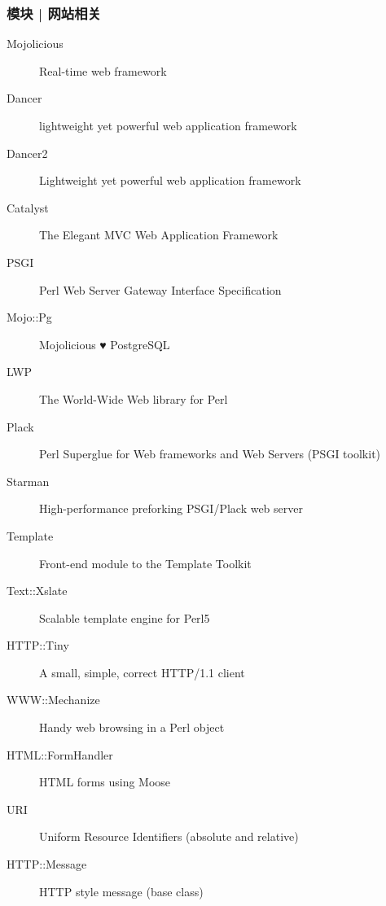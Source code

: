 \begin{frame}
  \frametitle{模块 | 网站相关}
  {\footnotesize
    \begin{description}
      \item[Mojolicious] Real-time web framework 
      \item[Dancer] lightweight yet powerful web application framework 
      \item[Dancer2] Lightweight yet powerful web application framework 
      \item[Catalyst] The Elegant MVC Web Application Framework 
      \item[PSGI] Perl Web Server Gateway Interface Specification
      \item[Mojo::Pg] Mojolicious ♥ PostgreSQL
      \item[LWP] The World-Wide Web library for Perl 
      \item[Plack] Perl Superglue for Web frameworks and Web Servers (PSGI toolkit) 
      \item[Starman] High-performance preforking PSGI/Plack web server
      \item[Template] Front-end module to the Template Toolkit
      \item[Text::Xslate] Scalable template engine for Perl5
      \item[HTTP::Tiny] A small, simple, correct HTTP/1.1 client
      \item[WWW::Mechanize] Handy web browsing in a Perl object
      \item[HTML::FormHandler] HTML forms using Moose
      \item[URI] Uniform Resource Identifiers (absolute and relative)
      \item[HTTP::Message] HTTP style message (base class)
    \end{description}
}
\end{frame}

